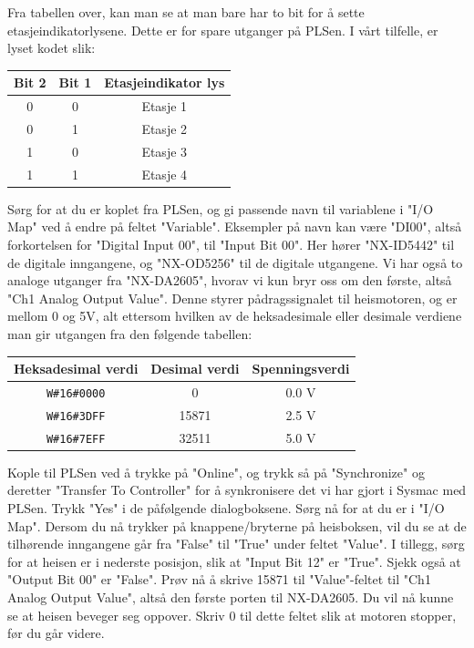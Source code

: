 \begin{alphasection}
Fra tabellen over, kan man se at man bare har to bit for å sette etasjeindikatorlysene. Dette er for spare utganger på PLSen. I vårt tilfelle, er lyset kodet slik:

\begin{center}
 {\begin{tabular}{|c| c| c|} 
 \hline
 \textbf{Bit 2} & \textbf{Bit 1} & \textbf{Etasjeindikator lys} \\ 
 \toprule
 0 & 0 & Etasje 1 \\ 
 \hline
 0 & 1 & Etasje 2 \\
 \hline
 1 & 0 & Etasje 3 \\
 \hline
 1 & 1 & Etasje 4 \\
 \toprule
\end{tabular}}
\end{center}

Sørg for at du er koplet fra PLSen, og gi passende navn til variablene i "I/O Map" ved å endre på feltet "Variable". Eksempler på navn kan være "DI00", altså forkortelsen for "Digital Input 00", til "Input Bit 00". Her hører "NX-ID5442" til de digitale inngangene, og "NX-OD5256" til de digitale utgangene. Vi har også to analoge utganger fra "NX-DA2605", hvorav vi kun bryr oss om den første, altså "Ch1 Analog Output Value". Denne styrer pådragssignalet til heismotoren, og er mellom 0 og 5V, alt ettersom hvilken av de heksadesimale eller desimale verdiene man gir utgangen fra den følgende tabellen:

\begin{center}
 {\begin{tabular}{|c| c| c|} 
 \hline
 \textbf{Heksadesimal verdi} & \textbf{Desimal verdi} & \textbf{Spenningsverdi} \\ 
 \toprule
 \verb|W#16#0000| & 0 & 0.0 \si{\V} \\ 
 \hline
 \verb|W#16#3DFF| & 15871 & 2.5 \si{\V}  \\
 \hline
 \verb|W#16#7EFF| & 32511 & 5.0 \si{\V}  \\

 \toprule
\end{tabular}}
\end{center}

Kople til PLSen ved å trykke på "Online", og trykk så på "Synchronize" og deretter "Transfer To Controller" for å synkronisere det vi har gjort i Sysmac med PLSen. Trykk "Yes" i de påfølgende dialogboksene. Sørg nå for at du er i "I/O Map". Dersom du nå trykker på knappene/bryterne på heisboksen, vil du se at de tilhørende inngangene går fra "False" til "True" under feltet "Value". I tillegg, sørg for at heisen er i nederste posisjon, slik at "Input Bit 12" er "True". Sjekk også at "Output Bit 00" er "False". Prøv nå å skrive 15871 til "Value"-feltet til "Ch1 Analog Output Value", altså den første porten til NX-DA2605. Du vil nå kunne se at heisen beveger seg oppover. Skriv 0 til dette feltet slik at motoren stopper, før du går videre.


\end{alphasection}
